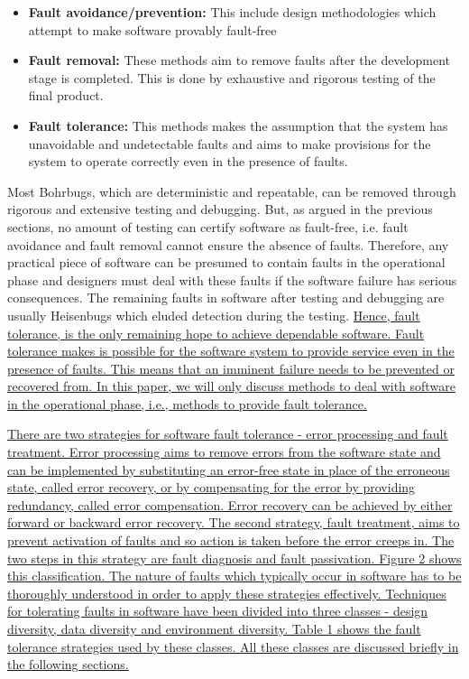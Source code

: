 \documentclass[a4paper, 11pt]{article}
\begin{document}
\begin{itemize}
\item \textbf{Fault avoidance/prevention:} This include design methodologies which attempt to make software provably fault-free
\item \textbf{Fault removal:} These methods aim to remove faults after the development stage is completed. This is done by exhaustive and rigorous testing of the final product.
\item \textbf{Fault tolerance:} This methods makes the assumption that the system has unavoidable and undetectable faults and aims to make provisions for the system to operate correctly even in the presence of faults.
\end{itemize}

Most Bohrbugs, which are deterministic and repeatable, can be removed through rigorous and extensive testing and debugging. But, as argued in the previous sections, no amount of testing can certify software as fault-free, i.e. fault avoidance and fault removal cannot ensure the absence of faults. Therefore, any practical piece of software can be presumed to contain faults in the operational phase and designers must deal with these faults if the software failure has serious consequences. The remaining faults in software after testing and debugging are usually Heisenbugs which eluded detection during the testing. \ul{Hence, fault tolerance, is the only remaining hope to achieve dependable software. Fault tolerance makes is possible for the software system to provide service even in the presence of faults. This means that an imminent failure needs to be prevented or recovered from. In this paper, we will only discuss methods to deal with software in the operational phase, i.e., methods to provide fault tolerance.}

\ul{There are two strategies for software fault tolerance - error processing and fault treatment. Error processing aims to remove errors from the software state and can be implemented by substituting an error-free state in place of the erroneous state, called error recovery, or by compensating for the error by providing redundancy, called error compensation. Error recovery can be achieved by either forward or backward error recovery. The second strategy, fault treatment, aims to prevent activation of faults and so action is taken before the error creeps in. The two steps in this strategy are fault diagnosis and fault passivation. Figure 2 shows this classification. The nature of faults which typically occur in software has to be thoroughly understood in order to apply these strategies effectively. Techniques for tolerating faults in software have been divided into three classes - design diversity, data diversity and environment diversity. Table 1 shows the fault tolerance strategies used by these classes. All these classes are discussed briefly in the following sections.}
\end{document}
